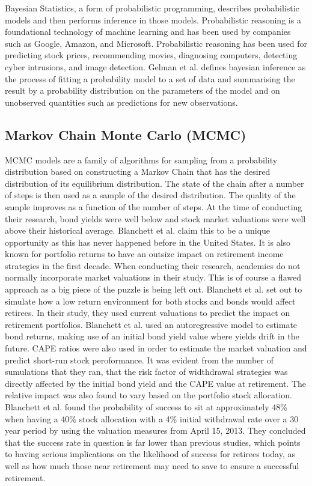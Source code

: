 Bayesian Statistics, a form of probabilistic programming, describes probabilistic models and then performs inference in those models. Probabilistic reasoning is a foundational technology of machine learning and has been used by companies such as Google, Amazon, and Microsoft. Probabilistic reasoning has been used for predicting stock prices, recommending movies, diagnosing computers, detecting cyber intrusions, and image detection. Gelman et al. defines bayesian inference as the process of fitting a probability model to a set of data and summarising the result by a probability distribution on the parameters of the model and on unobserved quantities such as predictions for new observations.\cite{Gelman:2014aa}

\subsection{Markov Chain Monte Carlo (MCMC)}

MCMC models are a family of algorithms for sampling from a probability distribution based on constructing a Markov Chain that has the desired distribution of its equilibrium distribution. The state of the chain after a number of steps is then used as a sample of the desired distribution. The quality of the sample improves as a function of the number of steps. At the time of conducting their research, bond yields were well below and stock market valuations were well above their historical average.\cite{Blanchett:2013aa} Blanchett et al. claim this to be a unique opportunity as this has never happened before in the United States. It is also known for portfolio returns to have an outsize impact on retirement income strategies in the first decade. When conducting their research, academics do not normally incorporate market valuations in their study. This is of course a flawed approach as a big piece of the puzzle is being left out. Blanchett et al. set out to simulate how a low return environment for both stocks and bonds would affect retirees. In their study, they used current valuations to predict the impact on retirement portfolios. Blanchett et al. used an autoregressive model to estimate bond returns, making use of an initial bond yield value where yields drift in the future. CAPE ratios were also used in order to estimate the market valuation and predict short-run stock peroformance. It was evident from the number of sumulations that they ran, that the risk factor of widthdrawal strategies was directly affected by the initial bond yield and the CAPE value at retirement. The relative impact was also found to vary based on the portfolio stock allocation. Blanchett et al. found the probability of success to sit at approximately 48\% when having a 40\% stock allocation with a 4\% initial withdrawal rate over a 30 year period by using the valuation measures from April 15, 2013. They concluded that the success rate in question is far lower than previous studies, which points to having serious implications on the likelihood of success for retirees today, as well as how much those near retirement may need to save to ensure a successful retirement.


